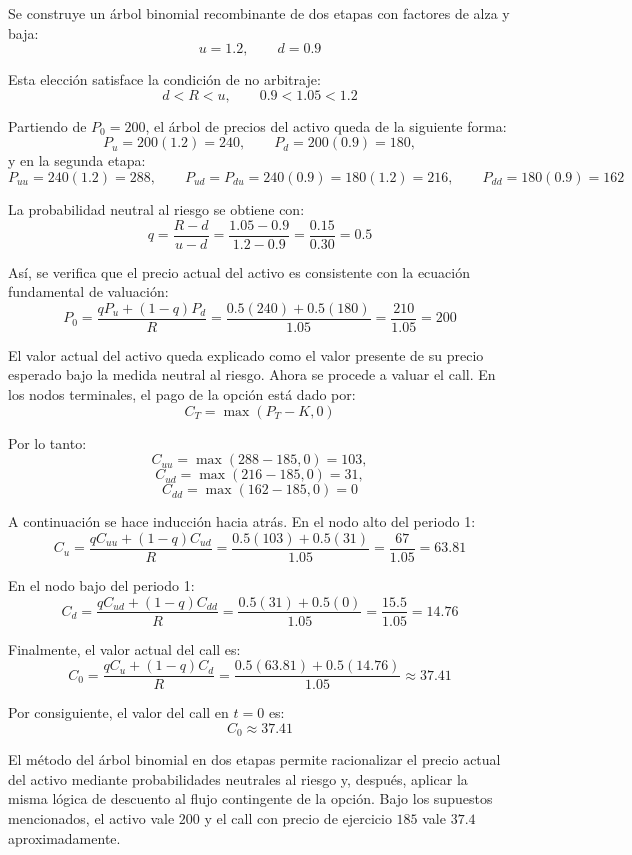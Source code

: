 \documentclass{article}\usepackage[]{graphicx}\usepackage[]{xcolor}
\begin{document}
Se construye un árbol binomial recombinante de dos etapas con factores de alza y baja:
\[
u=1.2,
\qquad d=0.9
\]

Esta elección satisface la condición de no arbitraje:
\[
d<R<u,
\qquad 0.9 < 1.05 < 1.2
\]

Partiendo de \(P_0=200\), el árbol de precios del activo queda de la siguiente forma:
\[
P_u=200 (1.2)=240,
\qquad
P_d=200 (0.9)=180,
\]
y en la segunda etapa:
\[
P_{uu}=240 (1.2)=288,
\qquad
P_{ud}=P_{du}=240 (0.9)=180 (1.2)=216,
\qquad
P_{dd}=180 (0.9)=162
\]

La probabilidad neutral al riesgo se obtiene con:
\[
q=\frac{R-d}{u-d}
=\frac{1.05-0.9}{1.2-0.9}
=\frac{0.15}{0.30}=0.5
\]

Así, se verifica que el precio actual del activo es consistente con la ecuación fundamental de valuación:
\[
P_0=\frac{qP_u+(1-q)P_d}{R}
=\frac{0.5(240)+0.5(180)}{1.05}
=\frac{210}{1.05}=200
\]

El valor actual del activo queda explicado como el valor presente de su precio esperado bajo la medida neutral al riesgo. Ahora se procede a valuar el call. En los nodos terminales, el pago de la opción está dado por:
\[
C_T=\max(P_T-K,0)
\]

Por lo tanto:
\[
C_{uu}=\max (288-185,0)=103,
\]
\[
C_{ud}=\max (216-185,0)=31,
\]
\[
C_{dd}=\max (162-185,0)=0
\]

A continuación se hace inducción hacia atrás. En el nodo alto del periodo 1:
\[
C_u=\frac{qC_{uu}+(1-q)C_{ud}}{R}
=\frac{0.5(103)+0.5(31)}{1.05}
=\frac{67}{1.05}=63.81
\]

En el nodo bajo del periodo 1:
\[
C_d=\frac{qC_{ud}+(1-q)C_{dd}}{R}=\frac{0.5(31)+0.5(0)}{1.05}=\frac{15.5}{1.05}=14.76
\]

Finalmente, el valor actual del call es:
\[
C_0=\frac{qC_u+(1-q)C_d}{R}
=\frac{0.5(63.81)+0.5(14.76)}{1.05}
\approx 37.41
\]

Por consiguiente, el valor del call en \(t=0\) es:
\[
\boxed{C_0\approx 37.41}
\]

El método del árbol binomial en dos etapas permite racionalizar el precio actual del activo mediante probabilidades neutrales al riesgo y, después, aplicar la misma lógica de descuento al flujo contingente de la opción. Bajo los supuestos mencionados, el activo vale \(200\) y el call con precio de ejercicio \(185\) vale \(37.4\) aproximadamente.
\end{document}
